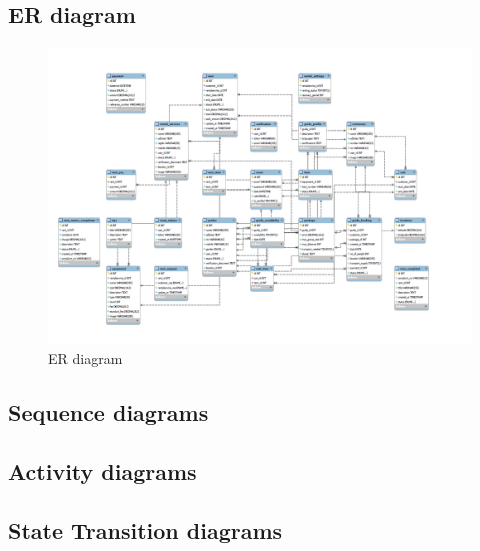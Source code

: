 \subsection{ER diagram}
\begin{figure}[h!]
    \centering
    \includegraphics[width=1\textwidth]{Images/ER WB.png}
    \caption{ER diagram}
    \label{fig:enter-label}
\end{figure}
\clearpage


\subsection{Sequence diagrams}

\clearpage

\subsection{Activity diagrams}

\clearpage

\subsection{State Transition diagrams}

\clearpage